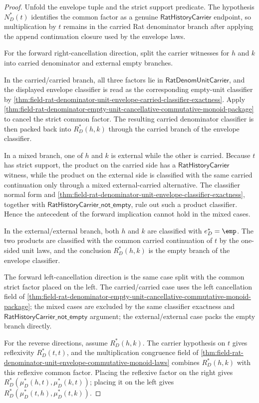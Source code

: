 \begin{proof}
Unfold the envelope tuple and the strict support predicate. The hypothesis
$N_D^\ast(t)$ identifies the common factor as a genuine
$\mathsf{RatHistoryCarrier}$ endpoint, so multiplication by $t$ remains in the
carried Rat denominator branch after applying the append continuation closure
used by the envelope laws.

For the forward right-cancellation direction, split the carrier witnesses for
$h$ and $k$ into carried denominator and external empty branches.

In the carried/carried branch, all three factors lie in
$\mathsf{RatDenomUnitCarrier}$, and the displayed envelope classifier is read
as the corresponding empty-unit classifier by
\autoref{thm:field-rat-denominator-unit-envelope-carried-classifier-exactness}.
Apply
\autoref{thm:field-rat-denominator-empty-unit-cancellative-commutative-monoid-package}
to cancel the strict common factor. The resulting carried denominator
classifier is then packed back into $R_D^\ast(h,k)$ through the carried branch
of the envelope classifier.

In a mixed branch, one of $h$ and $k$ is external while the other is carried.
Because $t$ has strict support, the product on the carried side has a
$\mathsf{RatHistoryCarrier}$ witness, while the product on the external side is
classified with the same carried continuation only through a mixed
external-carried alternative. The classifier normal form and
\autoref{thm:field-rat-denominator-unit-envelope-classifier-exactness}, together
with $\mathsf{RatHistoryCarrier\_not\_empty}$, rule out such a product
classifier. Hence the antecedent of the forward implication cannot hold in the
mixed cases.

In the external/external branch, both $h$ and $k$ are classified with
$e_D^\ast=\emp$. The two products are classified with the common carried
continuation of $t$ by the one-sided unit laws, and the conclusion
$R_D^\ast(h,k)$ is the empty branch of the envelope classifier.

The forward left-cancellation direction is the same case split with the common
strict factor placed on the left. The carried/carried case uses the left
cancellation field of
\autoref{thm:field-rat-denominator-empty-unit-cancellative-commutative-monoid-package};
the mixed cases are excluded by the same classifier exactness and
$\mathsf{RatHistoryCarrier\_not\_empty}$ argument; the external/external case
packs the empty branch directly.

For the reverse directions, assume $R_D^\ast(h,k)$. The carrier hypothesis on
$t$ gives reflexivity $R_D^\ast(t,t)$, and the multiplication congruence field
of
\autoref{thm:field-rat-denominator-unit-envelope-commutative-monoid-laws}
combines $R_D^\ast(h,k)$ with this reflexive common factor. Placing the
reflexive factor on the right gives
$R_D^\ast(\mu_D^\ast(h,t),\mu_D^\ast(k,t))$; placing it on the left gives
$R_D^\ast(\mu_D^\ast(t,h),\mu_D^\ast(t,k))$.
\end{proof}


